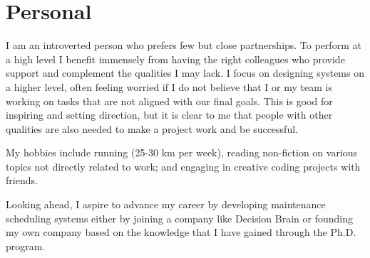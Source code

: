 \section*{Personal}

I am an introverted person who prefers few but close partnerships. To perform at a high level
I benefit immensely from having the right colleagues who provide support and complement the 
qualities I may lack. I focus on designing systems on a higher level, often feeling worried if I 
do not believe that I or my team is working on tasks that are not aligned with our final goals. 
This is good for inspiring and setting direction, but it is clear to me that people with other 
qualities are also needed to make a project work and be successful.

My hobbies include running (25-30 km per week), reading non-fiction on various topics not directly related to work; 
and engaging in creative coding projects with friends.

Looking ahead, I aspire to advance my career by developing maintenance scheduling systems
either by joining a company like Decision Brain or founding my own company based on the
knowledge that I have gained through the Ph.D. program.

